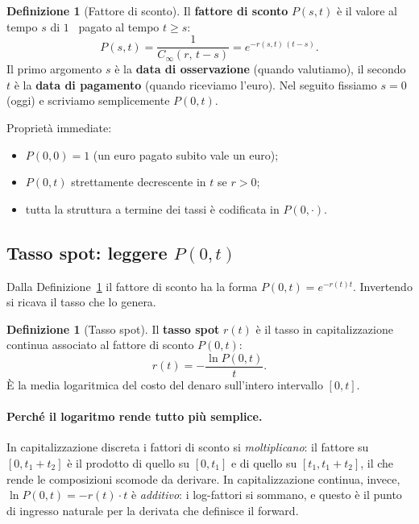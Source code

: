 \documentclass[11pt,a4paper]{article}
\theoremstyle{plain}
\theoremstyle{definition}
\newtheorem{definizione}[teorema]{Definizione}
\theoremstyle{remark}
\begin{document}
\begin{definizione}[Fattore di sconto]
\label{def:sconto}
Il \textbf{fattore di sconto} $P(s,t)$ \`e il valore al tempo $s$ di $1$~\texteuro{}
pagato al tempo $t \ge s$:
\[
  P(s,t) = \frac{1}{C_\infty(r,\,t-s)} = e^{-r(s,t)\,(t-s)}.
\]
Il primo argomento $s$ \`e la \textbf{data di osservazione} (quando valutiamo), il secondo
$t$ \`e la \textbf{data di pagamento} (quando riceviamo l'euro). Nel seguito fissiamo
$s = 0$ (oggi) e scriviamo semplicemente $P(0,t)$.

Propriet\`a immediate:
\begin{itemize}
  \item $P(0,0) = 1$ (un euro pagato subito vale un euro);
  \item $P(0,t)$ strettamente decrescente in $t$ se $r > 0$;
  \item tutta la struttura a termine dei tassi \`e codificata in $P(0,\cdot)$.
\end{itemize}
\end{definizione}

\subsection{Tasso spot: leggere $P(0,t)$}

Dalla Definizione~\ref{def:sconto} il fattore di sconto ha la forma $P(0,t)=e^{-r(t)t}$.
Invertendo si ricava il tasso che lo genera.

\begin{definizione}[Tasso spot]
\label{def:spot}
Il \textbf{tasso spot} $r(t)$ \`e il tasso in capitalizzazione continua associato al
fattore di sconto $P(0,t)$:
\begin{equation}
  r(t) = -\frac{\ln P(0,t)}{t}.
  \label{eq:spot-inv}
\end{equation}
\`E la media logaritmica del costo del denaro sull'intero intervallo $[0,t]$.
\end{definizione}

\paragraph{Perch\'e il logaritmo rende tutto pi\`u semplice.}
In capitalizzazione discreta i fattori di sconto si \emph{moltiplicano}: il fattore su
$[0,t_1+t_2]$ \`e il prodotto di quello su $[0,t_1]$ e di quello su $[t_1,t_1+t_2]$,
il che rende le composizioni scomode da derivare. In capitalizzazione continua, invece,
$\ln P(0,t) = -r(t)\cdot t$ \`e \emph{additivo}: i log-fattori si sommano, e questo
\`e il punto di ingresso naturale per la derivata che definisce il forward.
\end{document}

